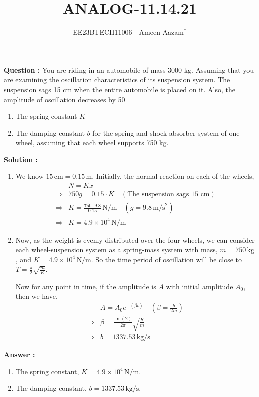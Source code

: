 \documentclass[journal,12pt,twocolumn]{IEEEtran}
\theoremstyle{remark}
\begin{document}

\vspace{3cm}

\title{ANALOG-11.14.21}
\author{EE23BTECH11006 - Ameen Aazam$^{*}$%
}
\maketitle
\newpage
\bigskip

\renewcommand{\thefigure}{\theenumi}
\renewcommand{\thetable}{\theenumi}


\vspace{3cm}
\textbf{Question :}
You are riding in an automobile of mass 3000 kg. Assuming that you are examining the oscillation characteristics of its suspension system. The suspension sags 15 cm when the entire automobile is placed on it. Also, the amplitude of oscillation decreases by 50%
\begin{enumerate}[label=(\alph*)]
    \item The spring constant \( K \)
    \item The damping constant \( b \) for the spring and shock absorber system of one wheel, assuming that each wheel supports 750 kg.
\end{enumerate}

\textbf{Solution :}

\begin{enumerate}[label=\textbf{Part-\alph*:}]
    \item We know \(15\, \text{cm} = 0.15\, \text{m}\). Initially, the normal reaction on each of the wheels,
    \begin{align}
&N = Kx \\
\Rightarrow &750g = 0.15 \cdot K \quad (\text{The suspension sags 15 cm})\\
\Rightarrow &K = \frac{750 \cdot 9.8}{0.15}\, \text{N/m} \quad (g = 9.8\, \text{m/s}^2) \\
\Rightarrow &K = 4.9 \times 10^4\, \text{N/m}        
    \end{align}
    

    \item Now, as the weight is evenly distributed over the four wheels, we can consider each wheel-suspension system as a spring-mass system with mass, \(m = 750\, \text{kg}\), and \(K = 4.9 \times 10^4\, \text{N/m}\). So the time period of oscillation will be close to \(T = \frac{\pi}{2} \sqrt{\frac{m}{K}}\).

    Now for any point in time, if the amplitude is \(A\) with initial amplitude \(A_{\text{0}}\), then we have,
    \begin{align}
&A = A_{\text{0}}e^{-(\beta t)} \quad (\beta = \frac{b}{2m}) \\
\Rightarrow &\beta = \frac{\ln(2)}{2\pi} \sqrt{\frac{K}{m}} \quad \\
\Rightarrow &b = 1337.53\, \text{kg/s} 
    \end{align}
\end{enumerate}

\textbf{Answer :}

\begin{enumerate}[label=\textbf{Part-\alph*:}]
    \item The spring constant, \(K = 4.9 \times 10^4\, \text{N/m}\).
    \item The damping constant, \(b = 1337.53\, \text{kg/s}\).
\end{enumerate}
\end{document}
